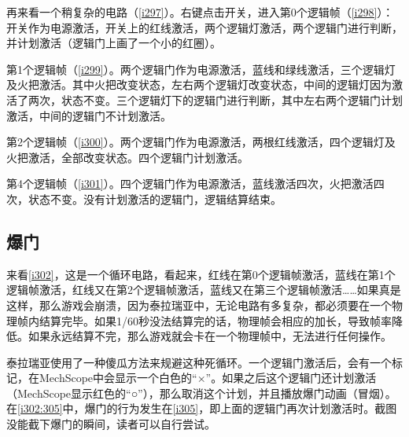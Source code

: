 再来看一个稍复杂的电路（\autoref{i297}）。右键点击开关，进入第0个逻辑帧（\autoref{i298}）：开关作为电源激活，开关上的红线激活，两个逻辑灯激活，两个逻辑门进行判断，并计划激活（逻辑门上画了一个小的红圈）。

第1个逻辑帧（\autoref{i299}）。两个逻辑门作为电源激活，蓝线和绿线激活，三个逻辑灯及火把激活。其中火把改变状态，左右两个逻辑灯改变状态，中间的逻辑灯因为激活了两次，状态不变。三个逻辑灯下的逻辑门进行判断，其中左右两个逻辑门计划激活，中间的逻辑门不计划激活。

第2个逻辑帧（\autoref{i300}）。两个逻辑门作为电源激活，两根红线激活，四个逻辑灯及火把激活，全部改变状态。四个逻辑门计划激活。

第4个逻辑帧（\autoref{i301}）。四个逻辑门作为电源激活，蓝线激活四次，火把激活四次，状态不变。没有计划激活的逻辑门，逻辑结算结束。

\subsection{爆门}

来看\autoref{i302}，这是一个循环电路，看起来，红线在第0个逻辑帧激活，蓝线在第1个逻辑帧激活，红线又在第2个逻辑帧激活，蓝线又在第三个逻辑帧激活……如果真是这样，那么游戏会崩溃，因为泰拉瑞亚中，无论电路有多复杂，都必须要在一个物理帧内结算完毕。如果1/60秒没法结算完的话，物理帧会相应的加长，导致帧率降低。如果永远结算不完，那么游戏就会卡在一个物理帧中，无法进行任何操作。

泰拉瑞亚使用了一种傻瓜方法来规避这种死循环。一个逻辑门激活后，会有一个标记，在MechScope中会显示一个白色的“×”。如果之后这个逻辑门还计划激活（MechScope显示红色的“○”），那么取消这个计划，并且播放爆门动画（冒烟）。在\autoref{i302:305}中，爆门的行为发生在\autoref{i305}，即上面的逻辑门再次计划激活时。截图没能截下爆门的瞬间，读者可以自行尝试。

